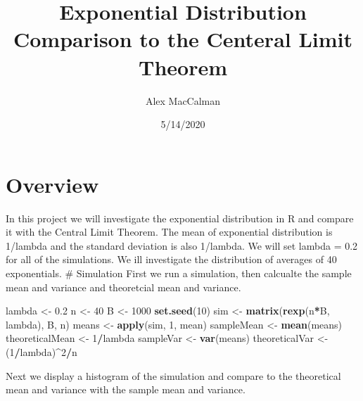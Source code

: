 \documentclass[
]{article}
\title{Exponential Distribution Comparison to the Centeral Limit Theorem}
\author{Alex MacCalman}
\date{5/14/2020}
\newenvironment{Shaded}{\begin{snugshade}}{\end{snugshade}}
\newcommand{\DecValTok}[1]{\textcolor[rgb]{0.00,0.00,0.81}{#1}}
\newcommand{\FloatTok}[1]{\textcolor[rgb]{0.00,0.00,0.81}{#1}}
\newcommand{\KeywordTok}[1]{\textcolor[rgb]{0.13,0.29,0.53}{\textbf{#1}}}
\newcommand{\NormalTok}[1]{#1}
\newcommand{\OperatorTok}[1]{\textcolor[rgb]{0.81,0.36,0.00}{\textbf{#1}}}
\newcommand{\StringTok}[1]{\textcolor[rgb]{0.31,0.60,0.02}{#1}}
\begin{document}
\maketitle

\hypertarget{overview}{%
\section{Overview}\label{overview}}

In this project we will investigate the exponential distribution in R
and compare it with the Central Limit Theorem. The mean of exponential
distribution is 1/lambda and the standard deviation is also 1/lambda. We
will set lambda = 0.2 for all of the simulations. We ill investigate the
distribution of averages of 40 exponentials. \# Simulation First we run
a simulation, then calcualte the sample mean and variance and
theoretcial mean and variance.

\begin{Shaded}
\begin{Highlighting}[]
\NormalTok{lambda <-}\StringTok{ }\FloatTok{0.2}
\NormalTok{n <-}\StringTok{ }\DecValTok{40}
\NormalTok{B <-}\StringTok{ }\DecValTok{1000}
\KeywordTok{set.seed}\NormalTok{(}\DecValTok{10}\NormalTok{)}
\NormalTok{sim <-}\StringTok{ }\KeywordTok{matrix}\NormalTok{(}\KeywordTok{rexp}\NormalTok{(n}\OperatorTok{*}\NormalTok{B, lambda), B, n)}
\NormalTok{means <-}\StringTok{ }\KeywordTok{apply}\NormalTok{(sim, }\DecValTok{1}\NormalTok{, mean)}
\NormalTok{sampleMean <-}\StringTok{ }\KeywordTok{mean}\NormalTok{(means)}
\NormalTok{theoreticalMean <-}\StringTok{ }\DecValTok{1}\OperatorTok{/}\NormalTok{lambda}
\NormalTok{sampleVar <-}\StringTok{ }\KeywordTok{var}\NormalTok{(means)}
\NormalTok{theoreticalVar <-}\StringTok{ }\NormalTok{(}\DecValTok{1}\OperatorTok{/}\NormalTok{lambda)}\OperatorTok{^}\DecValTok{2}\OperatorTok{/}\NormalTok{n}
\end{Highlighting}
\end{Shaded}

Next we display a histogram of the simulation and compare to the
theoretical mean and variance with the sample mean and variance.
\end{document}
